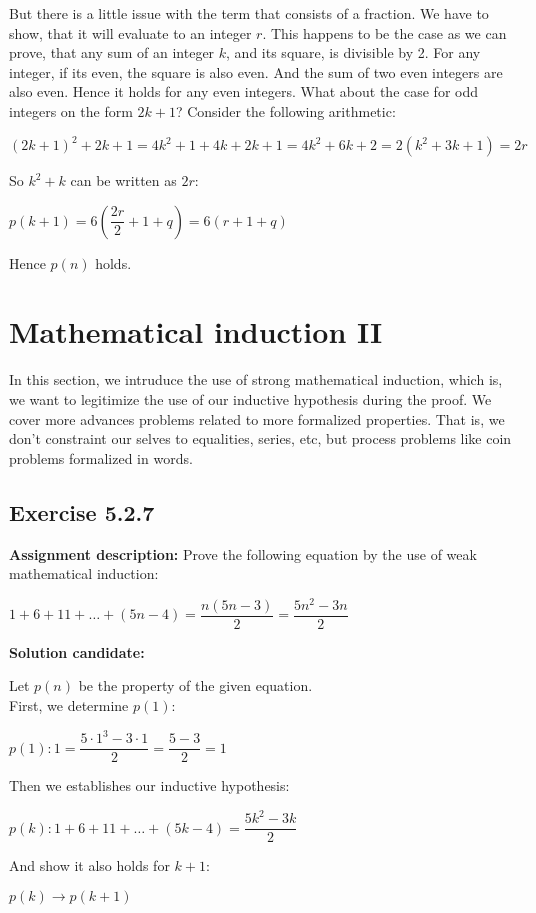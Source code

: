 \documentclass{report}
\newcommand{\cent}[1]{\begin{center}#1\end{center}}
\newcommand{\assignmentDescription}{\textbf{Assignment description: }}
\newcommand{\solution}{\textbf{Solution candidate: }}
\newcommand{\QED}{\boxed{}}
\newcommand{\Exercise}[1]{\subsection{Exercise #1}}
\newcommand{\parenthesis}[1]{\left( #1 \right)}
\begin{document}
 	But there is a little issue with the term that consists of a fraction. We have to show, that it will evaluate to an integer $r$. This happens to be the case as we can prove, that any sum of an integer $k$, and its square, is divisible by 2. For any integer, if its even, the square is also even. And the sum of two even integers are also even. Hence it holds for any even integers. What about the case for odd integers on the form $2k+1$? Consider the following arithmetic:
 	
 	\cent{$(2k+1)^2 + 2k+1 = 4k^2+1+4k + 2k + 1 = 4k^2+6k+2 = 2(k^2+3k+1) = 2r$}
 	
 	So $k^2+k$ can be written as $2r$:
 	
 	\cent{$p(k+1) = 6\parenthesis{\dfrac{2r}{2} +1+ q} = 6(r+1+q)$}
 	
 	Hence $p(n)$ holds.\\
 	\QED
 	
 	\section{Mathematical induction II}
 	
 	In this section, we intruduce the use of strong mathematical induction, which is, we want to legitimize the use of our inductive hypothesis during the proof. We cover more advances problems related to more formalized properties. That is, we don't constraint our selves to equalities, series, etc, but process problems like coin problems formalized in words.
 	
 	\Exercise{5.2.7}
 	
 	\assignmentDescription
 	Prove the following equation by the use of weak mathematical induction:
 	
 	\cent{$1 + 6 + 11 + \dots + (5n-4) = \dfrac{n(5n-3)}{2} = \dfrac{5n^2-3n}{2}$}
 	
 	\solution
 	
 	Let $p(n)$ be the property of the given equation.\\
 	
 	First, we determine $p(1)$:
 	
 	\cent{$p(1) : 1 = \dfrac{5 \cdot 1^3 -3\cdot 1}{2} = \dfrac{5-3}{2} = 1$}
 	
 	Then we establishes our inductive hypothesis:
 	
 	\cent{$p(k) : 1 + 6 + 11 + \dots + (5k-4) = \dfrac{5k^2-3k}{2}$}
 	
 	And show it also holds for $k+1$:
 	
 	\cent{$p(k) \to p(k+1)$}
 	
\end{document}
